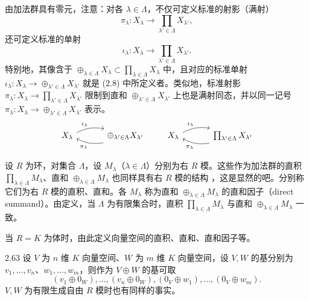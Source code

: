 由加法群具有零元，注意：对各 $\lambda\in\Lambda$，不仅可定义标准的射影（满射）
\[
  \pi_\lambda\colon X_\lambda\to \prod_{\lambda'\in\Lambda}X_{\lambda'},
\]
还可定义标准的单射
\[
  \iota_\lambda\colon X_\lambda\to \prod_{\lambda'\in\Lambda}X_{\lambda'}.
\]
特别地，其像含于 $\oplus_{\lambda\in\Lambda}X_\lambda\subset\prod_{\lambda\in\Lambda}X_\lambda$ 中，且对应的标准单射 $\iota_\lambda\colon X_\lambda\to\oplus_{\lambda'\in\Lambda}X_{\lambda'}$ 就是 (2.8) 中所定义者。类似地，标准射影 $\pi_\lambda\colon X_\lambda\to\prod_{\lambda'\in\Lambda}X_{\lambda'}$ 限制到直和 $\oplus_{\lambda'\in\Lambda}X_{\lambda'}$ 上也是满射同态，并以同一记号 $\pi_\lambda\colon X_\lambda\to\oplus_{\lambda'\in\Lambda}X_{\lambda'}$ 表示。
\[
  \begin{tikzcd}[row sep=1.2em, column sep=3.2em]
    X_\lambda \arrow[r, bend left=18, "\iota_\lambda"] & \oplus_{\lambda'\in\Lambda}X_{\lambda'} \arrow[l, bend left=18, "\pi_\lambda"]
  \end{tikzcd}
  \qquad
  \begin{tikzcd}[row sep=1.2em, column sep=3.2em]
    X_\lambda \arrow[r, bend left=18, "\iota_\lambda"] & \prod_{\lambda'\in\Lambda}X_{\lambda'} \arrow[l, bend left=18, "\pi_\lambda"]
  \end{tikzcd}
\]


设 $R$ 为环，对集合 $\Lambda$，设 $M_\lambda$（$\lambda\in\Lambda$）分别为右 $R$ 模。这些作为加法群的直积 $\prod_{\lambda\in\Lambda}M_\lambda$、直和 $\oplus_{\lambda\in\Lambda}M_\lambda$ 也同样具有右 $R$ 模的结构
，这是显然的吧。分别称它们为右 $R$ 模的直积、直和。各 $M_\lambda$ 称为直和 $\oplus_{\lambda\in\Lambda}M_\lambda$ 的直和因子（direct summand）。由定义，当 $\Lambda$ 为有限集合时，直积 $\prod_{\lambda\in\Lambda}M_\lambda$ 与直和 $\oplus_{\lambda\in\Lambda}M_\lambda$ 一致。

当 $R=K$ 为体时，由此定义向量空间的直积、直和、直和因子等。

\begin{remark}{2.63} 设 $V$ 为 $n$ 维 $K$ 向量空间、$W$ 为 $m$ 维 $K$ 向量空间，设 $V,W$ 的基分别为 $v_1,\ldots,v_n$、$w_1,\ldots,w_m$，则作为 $V\oplus W$ 的基可取
\[
  (v_1\oplus0_W),\ldots,(v_n\oplus0_W),(0_V\oplus w_1),\ldots,(0_V\oplus w_m).
\]
$V,W$ 为有限生成自由 $R$ 模时也有同样的事实。\end{remark}

